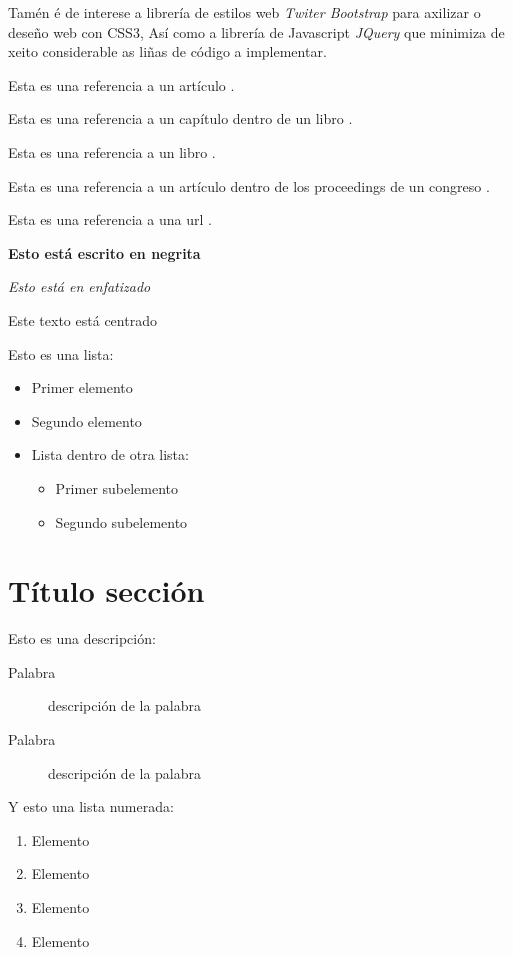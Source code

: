 		Tamén é de interese a librería de estilos web \emph{Twiter Bootstrap}
		\cite{bootstrap-page-url} para axilizar o deseño web con CSS3, Así como a 
		librería de Javascript \emph{JQuery} \cite{jquery-page-url} que minimiza de 
		xeito considerable as liñas de código a implementar.
		

\vspace{2cm}

Esta es una referencia a un artículo \cite{article-minimal}.

Esta es una referencia a un capítulo dentro de un libro \cite{inbook-minimal}.

Esta es una referencia a un libro \cite{book-minimal}.

Esta es una referencia a un artículo dentro de los proceedings de un congreso \cite{inproceedings-full}.

Esta es una referencia a una url \cite{misc-url}.

\textbf{Esto está escrito en negrita}


\emph{Esto está en enfatizado}

\begin{center}
Este texto está centrado
\end{center}


Esto es una lista:
\begin{itemize}
\item Primer elemento
\item Segundo elemento
\item Lista dentro de otra lista:
	\begin{itemize}
		\item Primer subelemento
		\item Segundo subelemento
	\end{itemize}
\end{itemize}


\section{Título sección}

Esto es una descripción:
\begin{description}
\item[Palabra] descripción de la palabra
\item[Palabra] descripción de la palabra
\end{description}


Y esto una lista numerada:
\begin{enumerate}
\item Elemento
\item Elemento
\item Elemento
\item Elemento
\end{enumerate}


